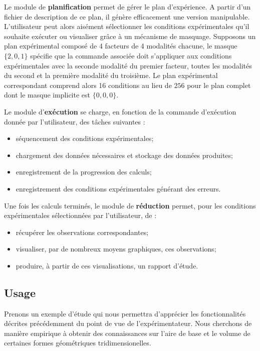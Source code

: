 Le module de \textbf{planification} permet de gérer le plan d'expérience. A partir d'un fichier de description de ce plan, il génère efficacement une version manipulable. L'utilisateur peut alors aisément sélectionner les conditions expérimentales qu'il souhaite exécuter ou visualiser grâce à un mécanisme de masquage. Supposons un plan expérimental composé de 4 facteurs de 4 modalités chacune, le masque $\{2, 0, 1\}$ spécifie que la commande associée doit s'appliquer aux conditions expérimentales avec la seconde modalité du premier facteur, toutes les modalités du second et la première modalité du troisième. Le plan expérimental correspondant comprend alors 16 conditions au lieu de  $256$ pour le plan complet dont le masque implicite est $\{0, 0, 0\}$.

Le module d'\textbf{exécution} se charge, en fonction de la commande d'exécution donnée par l'utilisateur, des tâches suivantes :
\begin{itemize}
  \item séquencement des conditions expérimentales;
  \item chargement des données nécessaires et stockage des données produites;
  \item enregistrement de la progression des calculs;
  \item enregistrement des conditions expérimentales générant des erreurs.
\end{itemize}

Une fois les calculs terminés, le module de \textbf{réduction} permet, pour les conditions expérimentales sélectionnées par l'utilisateur, de :
\begin{itemize}
  \item récupérer les observations correspondantes;
  \item visualiser, par de nombreux moyens graphiques, ces observations;
  \item produire, à partir de ces visualisations, un rapport d'étude.
\end{itemize}

\subsection{\nmu Usage}

Prenons un exemple d'étude qui nous permettra d'apprécier les fonctionnalités décrites précédemment du point de vue de l'expérimentateur. Nous cherchons de manière empirique à obtenir des connaissances sur l'aire de base et le volume de certaines formes géométriques tridimensionelles.


